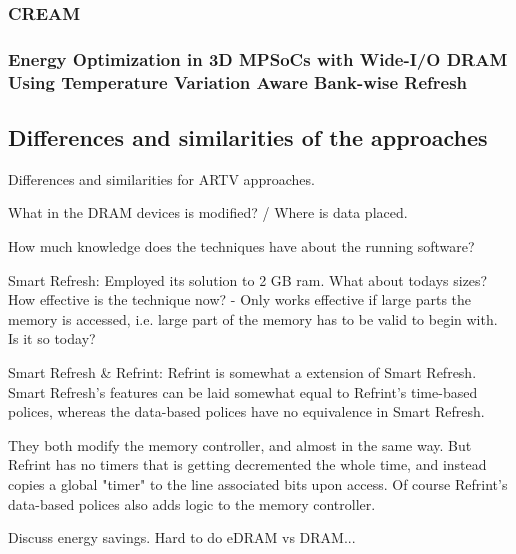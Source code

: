 \subsubsection*{\textbf{CREAM}}
\label{par:cream}



\subsubsection*{\textbf{Energy Optimization in 3D MPSoCs with Wide-I/O DRAM
Using Temperature Variation Aware Bank-wise Refresh}}
\label{par:tempaware}



\subsection{Differences and similarities of the approaches}

Differences and similarities for ARTV approaches.

What in the DRAM devices is modified? / Where is data placed.

How much knowledge does the techniques have about the running software?

Smart Refresh:
Employed its solution to 2 GB ram. What about todays sizes? How effective is the technique now? - Only works effective if large parts the memory is accessed, i.e. large part of the memory has to be valid to begin with. Is it so today?

Smart Refresh \& Refrint:
Refrint is somewhat a extension of Smart Refresh. Smart Refresh's features can be laid somewhat equal to Refrint's time-based polices, whereas the data-based polices have no equivalence in Smart Refresh.

They both modify the memory controller, and almost in the same way. But Refrint has no timers that is getting decremented the whole time, and instead copies a global "timer" to the line associated bits upon access. Of course Refrint's data-based polices also adds logic to the memory controller.

Discuss energy savings. Hard to do eDRAM vs DRAM...